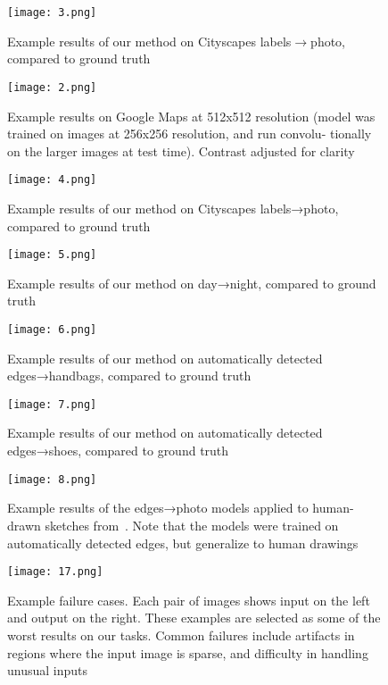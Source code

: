 \documentclass[10pt,twocolumn,letterpaper]{article}
\begin{document}
    \begin{figure}[!htbp]
 \centering
 \texttt{[image: 3.png]}\\
 \caption{Example results of our method on Cityscapes labels$\to$photo, compared to ground truth}\label{Figure11}
 \end{figure}
  \begin{figure}[!htbp]
 \centering
 \texttt{[image: 2.png]}\\
 \caption{Example results on Google Maps at 512x512 resolution (model was trained on images at 256x256 resolution, and run convolu-
tionally on the larger images at test time). Contrast adjusted for clarity}\label{Figure8}
 \end{figure}
   \begin{figure}[!htbp]
 \centering
 \texttt{[image: 4.png]}\\
 \caption{Example results of our method on Cityscapes labels→photo, compared to ground truth}\label{Figure12}
 \end{figure}
   \begin{figure}[!htbp]
 \centering
 \texttt{[image: 5.png]}\\
 \caption{Example results of our method on day→night, compared to ground truth}\label{Figure13}
 \end{figure}
    \begin{figure}[!htbp]
 \centering
 \texttt{[image: 6.png]}\\
 \caption{Example results of our method on automatically detected edges→handbags, compared to ground truth}\label{Figure14}
 \end{figure}
     \begin{figure}[!htbp]
 \centering
 \texttt{[image: 7.png]}\\
 \caption{Example results of our method on automatically detected edges→shoes, compared to ground truth}\label{Figure15}
 \end{figure}
     \begin{figure}[!htbp]
 \centering
 \texttt{[image: 8.png]}\\
 \caption{Example results of the edges→photo models applied to human-drawn sketches from~\cite{name10}. Note that the models were trained on
automatically detected edges, but generalize to human drawings}\label{Figure16}
 \end{figure}
      \begin{figure}[!htb]
 \centering
 \texttt{[image: 17.png]}\\
 \caption{Example failure cases. Each pair of images shows input on the left and output on the right. These examples are selected as some
of the worst results on our tasks. Common failures include artifacts in regions where the input image is sparse, and difficulty in handling
unusual inputs}\label{Figure17}
 \end{figure}
\end{document}
